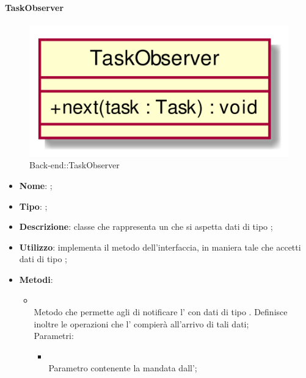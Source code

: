 \hypertarget{TaskObserver_label}{\paragraph{TaskObserver}}
\begin{figure}[h]
	\centering
	\includegraphics[width=\textwidth,height=\textheight,keepaspectratio]{images/ClassTaskObserver.png}
	\caption{Back-end::TaskObserver}
\end{figure}
\begin{itemize}
	\item \textbf{Nome}: ;
	\item \textbf{Tipo}: ;
	\item \textbf{Descrizione}: classe che rappresenta un  che si aspetta dati di tipo ;
	\item \textbf{Utilizzo}: implementa il metodo  dell'interfaccia, in maniera tale che accetti dati di tipo ;
	\item \textbf{Metodi}:
	\begin{itemize}
		\item[]  \\
		Metodo che permette agli  di notificare l' con dati di tipo . Definisce inoltre le operazioni che l' compierà all'arrivo di tali dati;\\
		Parametri:
		\begin{itemize}
			\item {} \\
			Parametro contenente la  mandata dall';
		\end{itemize}
	\end{itemize}
\end{itemize}
\FloatBarrier


